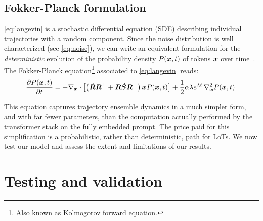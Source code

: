 \documentclass{article} %
\newcommand{\nb}[1]{{\color{teal} NB: #1}} %
\begin{document}
\subsection{Fokker-Planck formulation}

\cref{eq:langevin} is a stochastic differential equation (SDE) describing individual trajectories with a random component.
Since the noise distribution is well characterized (see \cref{eq:noise}), we can write an equivalent formulation for the \emph{deterministic} evolution of the probability density $P({\bm{x}},t)$ of tokens ${\bm{x}}$ over time~\citep{pavliotis2014stochastic}.
The Fokker-Planck equation\footnote{
Also known as Kolmogorov forward equation.
} 
associated to \cref{eq:langevin} reads: 
\begin{equation}\label{eq:fokker-planck}
    \frac{\partial P({\bm{x}}, t)}{\partial t} = -\nabla_{{\bm{x}}} \cdot \left[ \left( \dot{{\bm{R}}} {\bm{R}}^{\top} + {\bm{R}} \dot{{\bm{S}}} {\bm{R}}^{\top}  \right) {\bm{x}} P({\bm{x}}, t) \right] + \frac{1}{2} \alpha \lambda e^{\lambda t} \, \nabla_{{\bm{x}}}^2 P({\bm{x}}, t).
\end{equation}

This equation captures trajectory ensemble dynamics in a much simpler form, and with far fewer parameters, than the computation actually performed by the transformer stack on the fully embedded prompt.
The price paid for this simplification is a probabilistic, rather than deterministic, path for LoTs.
We now test our model and assess the extent and limitations of our results.



\section{Testing and validation}
\end{document}
